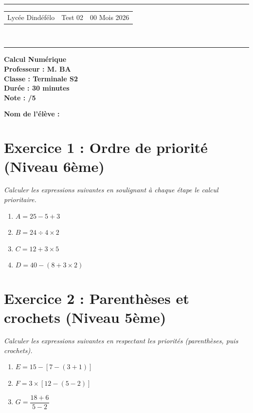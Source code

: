\documentclass[a4paper,12pt]{article}
\begin{document}
\hrule
\begin{center}
    \begin{tabular}{@{} p{5cm} p{5cm} p{5cm} @{}} 
        Lycée Dindéfélo & \quad\quad Test 02 & 00 Mois 2026 \\
    \end{tabular}
    \\[-0.01cm]
    \hrule
\end{center}

\begin{center}
    \textbf{\Large Calcul Numérique} \\[0.2cm]
    \textbf{\large Professeur : M. BA} \\[0.2cm]
    \textbf{Classe : Terminale S2} \\[0.2cm]
    \textbf{\small Durée : 30 minutes}\\[0.2cm]
    \textbf{\small Note : \quad /5}
\end{center}

\textbf{\small Nom de l'élève :} \underline{\hspace{8cm}} \\[0.7cm]

\section*{Exercice 1 : Ordre de priorité (Niveau 6ème)}
\textit{Calculer les expressions suivantes en soulignant à chaque étape le calcul prioritaire.}

\begin{enumerate}
    \item $A = 25 - 5 + 3$
    \item $B = 24 \div 4 \times 2$
    \item $C = 12 + 3 \times 5$
    \item $D = 40 - (8 + 3 \times 2)$
\end{enumerate}

\vspace{1cm}

\section*{Exercice 2 : Parenthèses et crochets (Niveau 5ème)}
\textit{Calculer les expressions suivantes en respectant les priorités (parenthèses, puis crochets).}

\begin{enumerate}
    \item $E = 15 - [7 - (3 + 1)]$
    \item $F = 3 \times [12 - (5 - 2)]$
    \item $G = \dfrac{18 + 6}{5 - 2}$
\end{enumerate}
\end{document}
